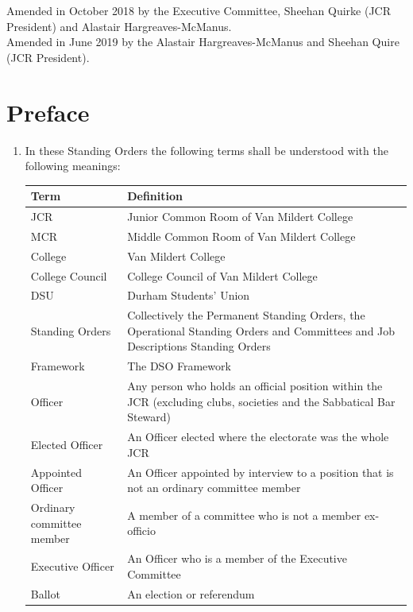 \documentclass[12pt]{article}  %
\begin{document}
Amended in October 2018 by the Executive Committee, Sheehan Quirke (JCR President) and Alastair Hargreaves-McManus.\\
Amended in June 2019 by the Alastair Hargreaves-McManus and Sheehan Quire (JCR President).
\newpage
\tableofcontents{}
\newpage


\section{Preface}
\begin{enumerate}
    \item In these Standing Orders the following terms shall be understood with the following meanings:\\
\begin{tabular}{|p{1.5in}|p{3.8in}|}\hline
    \textbf{Term}           & \textbf{Definition}\\ \hline
    JCR                     & Junior Common Room of Van Mildert College\\ \hline
    MCR                     & Middle Common Room of Van Mildert College\\ \hline
    College                 & Van Mildert College\\ \hline
    College Council         & College Council of Van Mildert College\\ \hline
    DSU                     & Durham Students' Union\\ \hline
    Standing Orders         & Collectively the Permanent Standing Orders, the Operational Standing Orders and Committees and Job Descriptions Standing Orders \\ \hline
    Framework               & The DSO Framework\\ \hline
    Officer                 & Any person who holds an official position within the JCR (excluding clubs, societies and the Sabbatical Bar Steward) \\ \hline
    Elected Officer         & An Officer elected where the electorate was the whole JCR \\ \hline
    Appointed Officer       & An Officer appointed by interview to a position that is not an ordinary committee member \\ \hline
    Ordinary committee member & A member of a committee who is not a member ex-officio \\ \hline
    Executive Officer       & An Officer who is a member of the Executive Committee \\ \hline
    Ballot                  & An election or referendum \\ \hline

\end{tabular}
\end{enumerate}
\end{document}

